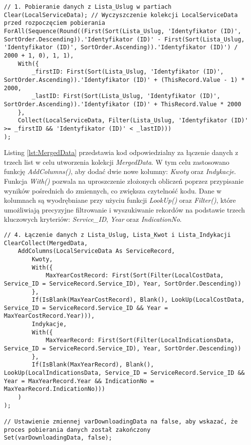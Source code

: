 \begin{lstlisting}[language=PowerFx]
// 1. Pobieranie danych z Lista_Uslug w partiach
Clear(LocalServiceData); // Wyczyszczenie kolekcji LocalServiceData przed rozpoczęciem pobierania
ForAll(Sequence(Round((First(Sort(Lista_Uslug, 'Identyfikator (ID)', SortOrder.Descending)).'Identyfikator (ID)' - First(Sort(Lista_Uslug, 'Identyfikator (ID)', SortOrder.Ascending)).'Identyfikator (ID)') / 2000 + 1, 0), 1, 1),
    With({
        _firstID: First(Sort(Lista_Uslug, 'Identyfikator (ID)', SortOrder.Ascending)).'Identyfikator (ID)' + (ThisRecord.Value - 1) * 2000,
        _lastID: First(Sort(Lista_Uslug, 'Identyfikator (ID)', SortOrder.Ascending)).'Identyfikator (ID)' + ThisRecord.Value * 2000
    },
    Collect(LocalServiceData, Filter(Lista_Uslug, 'Identyfikator (ID)' >= _firstID && 'Identyfikator (ID)' < _lastID)))
);
\end{lstlisting}

Listing \ref{lst:MergedData} przedstawia kod odpowiedzialny za łączenie danych z trzech list w celu utworzenia kolekcji \emph{MergedData}. W tym celu zastosowano funkcję \emph{AddColumns()}, aby dodać dwie nowe kolumny: \emph{Kwoty} oraz \emph{Indykacje}. Funkcja \emph{With()} pozwala na uproszczenie złożonych obliczeń poprzez przypisanie wyników pośrednich do zmiennych, co zwiększa czytelność kodu. Dane w kolumnach są wyodrębniane przy użyciu funkcji \emph{LookUp()} oraz \emph{Filter()}, które umożliwiają precyzyjne filtrowanie i wyszukiwanie rekordów na podstawie trzech kluczowych kryteriów: \emph{Service\_ID}, \emph{Year} oraz \emph{IndicationNo}.


\begin{lstlisting}[language=PowerFx]
// 4. Łączenie danych z Lista_Uslug, Lista_Kwot i Lista_Indykacji
ClearCollect(MergedData,
    AddColumns(LocalServiceData As ServiceRecord,
        Kwoty,
        With({
            MaxYearCostRecord: First(Sort(Filter(LocalCostData, Service_ID = ServiceRecord.Service_ID), Year, SortOrder.Descending))
        },
        If(IsBlank(MaxYearCostRecord), Blank(), LookUp(LocalCostData, Service_ID = ServiceRecord.Service_ID && Year = MaxYearCostRecord.Year))),
        Indykacje,
        With({
            MaxYearRecord: First(Sort(Filter(LocalIndicationsData, Service_ID = ServiceRecord.Service_ID), Year, SortOrder.Descending))
        },
        If(IsBlank(MaxYearRecord), Blank(), LookUp(LocalIndicationsData, Service_ID = ServiceRecord.Service_ID && Year = MaxYearRecord.Year && IndicationNo = MaxYearRecord.IndicationNo)))
    )
);

// Ustawienie zmiennej varDownloadingData na false, aby wskazać, że proces pobierania danych został zakończony
Set(varDownloadingData, false);
\end{lstlisting}

